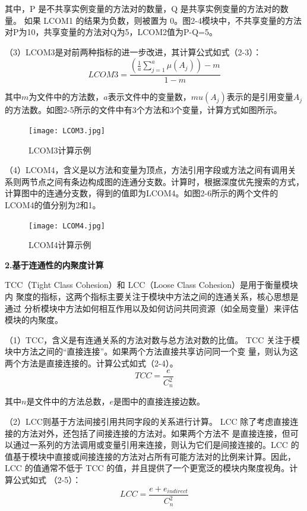其中，P 是不共享实例变量的方法对的数量，Q 是共享实例变量的方法对的数量。
如果 LCOM1 的结果为负数，则被置为 0。图2-4模块中，不共享变量的方法对P为10，共享变量的方法对Q为5，LCOM2值为P-Q=5。

（3）LCOM3是对前两种指标的进一步改进，其计算公式如式（2-3）：
\begin{equation}
LCOM3 = \frac{\left( \frac{1}{a} \sum_{j=1}^a \mu(A_j) \right) - m}{1 - m}
\end{equation}

其中\( m\)为文件中的方法数，\( a\)表示文件中的变量数，\( mu(A_j)\)表示的是引用变量\(A_j\)的方法数。如图2-5所示的文件中有3个方法和3个变量，计算方式如图所示。
\begin{figure}[h]
\centering
\texttt{[image: LCOM3.jpg]}
\caption{LCOM3计算示例}
\end{figure}



（4）LCOM4，含义是以方法和变量为顶点，方法引用字段或方法之间有调用关系则两节点之间有条边构成图的连通分支数\cite{1995Measuring}。计算时，根据深度优先搜索的方式，计算图中的连通分支数，得到的值即为LCOM4。如图2-6所示的两个文件的LCOM4的值分别为2和1。

\begin{figure}[h]
\centering
\texttt{[image: LCOM4.jpg]}
\caption{LCOM4计算示例}
\end{figure}

\noindent \textbf{2.基于连通性的内聚度计算}

TCC（Tight Class Cohesion）和 LCC（Loose Class Cohesion）是用于衡量模块内
聚度的指标，这两个指标主要关注于模块中方法之间的连通关系，核心思想是通过
分析模块中方法如何相互作用以及如何访问共同资源（如全局变量）来评估模块的内聚度。

（1）TCC，含义是有连通关系的方法对数与总方法对数的比值\cite{1995Cohesion}。
TCC 关注于模块中方法之间的“直接连接”。如果两个方法直接共享访问同一个变
量，则认为这两个方法是直接连接的。计算公式如式（2-4）。
\begin{equation}
{TCC} = \frac{e}{C_{n}^{2}}
\end{equation}

其中\(n\)是文件中的方法总数，\(e\)是图中的直接连接边数。

（2）LCC则基于方法间接引用共同字段的关系进行计算\cite{1995Cohesion}。
LCC 除了考虑直接连接的方法对外，还包括了间接连接的方法对。如果两个方法不
是直接连接，但可以通过一系列的方法调用或变量引用来连接，则认为它们是间接连接的。LCC 的值基于模块中直接或间接连接的方法对占所有可能方法对的比例来计算。因此，LCC 的值通常不低于 TCC 的值，并且提供了一个更宽泛的模块内聚度视角。计算公式如式 （2-5）：
\begin{equation}
{LCC=\frac{e+e_{indirect}}{C_{n}^{2}}}
\end{equation}

